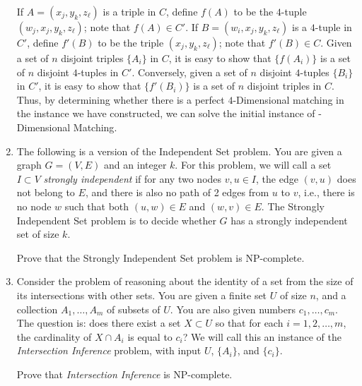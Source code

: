 \documentclass[12pt]{article}
\begin{document}
\begin{enumerate}
{If $A = (x_j,y_k,z_\ell)$ is a triple in $C$, define $f(A)$ to be 
the $4$-tuple $(w_j,x_j, y_k, z_\ell)$; note that $f(A) \in C'$.
If $B = (w_i, x_j, y_k, z_\ell)$ is a $4$-tuple in $C'$,
define $f'(B)$ to be the triple $(x_j,y_k,z_\ell)$; note that $f'(B) \in C$.
Given a set of $n$ disjoint triples $\{A_i\}$ in $C$,
it is easy to show that $\{f(A_i)\}$ is a set of $n$ disjoint 
$4$-tuples in $C'$.
Conversely, given a set of $n$ disjoint $4$-tuples $\{B_i\}$
in $C'$, it is easy to show that $\{f'(B_i)\}$ is a set of $n$ disjoint 
triples in $C$.
Thus, by determining whether there is a perfect $4$-Dimensional
matching in the instance we have constructed, we can solve
the initial instance of {-Dimensional Matching}.

}


\item 

The following is a version of the {\sc Independent Set}
problem. You are given a graph $G=(V,E)$ and an integer $k$. For this
problem, we will call a set $I \subset V$ {\em strongly independent}
if for any two nodes $v,u \in I$, the edge $(v,u)$ does not
belong to $E$, and there is also no path of 2 edges from $u$ to $v$,
i.e., there is no node $w$ such that both $(u,w) \in E$ and $(w,v)\in E$.
The {\sc Strongly Independent Set} problem is to decide whether $G$ has a
strongly independent set of size $k$.

Prove that the {\sc Strongly Independent Set} problem is NP-complete.




\item 

Consider the problem of reasoning about the identity of
a set from the size of its intersections with other sets.
You are given a finite set $U$ of size $n$, and
a collection $A_1, \ldots, A_m$ of subsets of $U$.
You are also given numbers $c_1, \ldots, c_m$.
The question is: does there exist a set $X \subset U$
so that for each $i = 1, 2, \ldots, m$,
the cardinality of $X \cap A_i$ is equal to $c_i$?
We will call this an instance of the
{\em Intersection Inference} problem,
with input $U$, $\{A_i\}$, and $\{c_i\}$.

Prove that {\em Intersection Inference} is NP-complete.




\end{enumerate}
\end{document}
